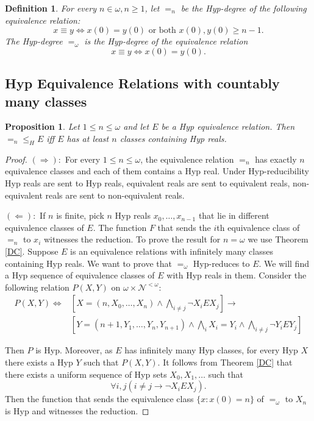 \documentclass[11pt, english]{article}
\newtheorem{prop}{Proposition}
\newtheorem{defn}{Definition}
\newcommand{\baire}{\mathscr N}
\begin{document}
\begin{defn}
For every $n\in\omega, n\geq 1$, let $=_n$ be the Hyp-degree of the following
equivalence relation:
$$
x\equiv y\Longleftrightarrow x(0)=y(0) \text{ or both }
x(0),y(0)\geq n-1.
$$
The Hyp-degree {$=_{\omega}$} is the Hyp-degree of the equivalence
relation
$$
x\equiv y\Longleftrightarrow x(0)=y(0).
$$
\end{defn}

\subsection{Hyp Equivalence Relations with countably many classes}

\begin{prop}\label{prop1}
Let $1\leq n\leq\omega$ and let $E$ be a Hyp equivalence relation. Then
$=_n\leq_HE$ iff $E$ has at least $n$ classes containing Hyp reals.
\end{prop}

\begin{proof}
$(\Rightarrow):$ For every $1\leq n\leq\omega$, the equivalence relation
$=_n$ has exactly $n$ equivalence classes and each of them contains
a Hyp real. Under Hyp-reducibility Hyp reals are sent to Hyp reals,
equivalent reals are sent to equivalent reals, non-equivalent reals
are sent to non-equivalent reals.

$(\Leftarrow):$ If $n$ is finite, pick $n$ Hyp reals
$x_0,\ldots,x_{n-1}$ that lie in different equivalence classes of
$E$. The function $F$ that sends the $i$th equivalence class of
$=_n$ to $x_i$ witnesses the reduction. To prove the result for
$n=\omega$ we use Theorem \ref{DC}. Suppose $E$ is an equivalence
relations with infinitely many classes containing Hyp reals. We want
to prove that $=_{\omega}$ Hyp-reduces to $E$. We will find a Hyp
sequence of equivalence classes of $E$ with Hyp reals in them.
Consider the following relation $P(X,Y)$ on
$\omega\times\baire^{<\omega}$:
\begin{align*}
P(X,Y)\iff & [X=(n,X_0,\ldots,X_n)\wedge\bigwedge_{i\neq j} \neg
X_iEX_j]\longrightarrow\\
& [Y=(n+1,Y_1,\ldots,Y_n,Y_{n+1})\wedge\bigwedge_i
X_i=Y_i\wedge\bigwedge_{i\neq j}\neg Y_iEY_j]
\end{align*}

Then $P$ is Hyp. Moreover, as $E$ has infinitely many Hyp classes,
for every Hyp $X$ there exists a Hyp $Y$ such that $P(X,Y)$. It
follows from Theorem \ref{DC} that there exists a uniform sequence
of Hyp sets $X_0,X_1,\ldots$ such that
$$
\forall i,j(i\neq j\rightarrow \neg X_iEX_j).
$$
Then the function that sends the equivalence class $\{x:x(0)=n\}$ of
$=_{\omega}$ to $X_n$ is Hyp and witnesses the reduction.
\end{proof}
\end{document}
